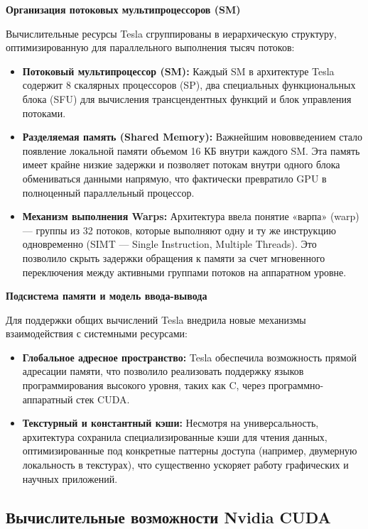 \documentclass{article}[14pt]
\begin{document}
\medskip \noindent \textbf{Организация потоковых мультипроцессоров (SM)}

Вычислительные ресурсы Tesla сгруппированы в иерархическую структуру, оптимизированную для параллельного выполнения тысяч потоков:
\begin{itemize}
    \item \textbf{Потоковый мультипроцессор (SM):} Каждый SM в архитектуре Tesla содержит 8 скалярных процессоров (SP), два специальных функциональных блока (SFU) для вычисления трансцендентных функций и блок управления потоками.
    \item \textbf{Разделяемая память (Shared Memory):} Важнейшим нововведением стало появление локальной памяти объемом 16 КБ внутри каждого SM. Эта память имеет крайне низкие задержки и позволяет потокам внутри одного блока обмениваться данными напрямую, что фактически превратило GPU в полноценный параллельный процессор.
    \item \textbf{Механизм выполнения Warps:} Архитектура ввела понятие «варпа» (warp) — группы из 32 потоков, которые выполняют одну и ту же инструкцию одновременно (SIMT — Single Instruction, Multiple Threads). Это позволило скрыть задержки обращения к памяти за счет мгновенного переключения между активными группами потоков на аппаратном уровне.
\end{itemize}

\medskip \noindent \textbf{Подсистема памяти и модель ввода-вывода}

Для поддержки общих вычислений Tesla внедрила новые механизмы взаимодействия с системными ресурсами:
\begin{itemize}
    \item \textbf{Глобальное адресное пространство:} Tesla обеспечила возможность прямой адресации памяти, что позволило реализовать поддержку языков программирования высокого уровня, таких как C, через программно-аппаратный стек CUDA.
    \item \textbf{Текстурный и константный кэши:} Несмотря на универсальность, архитектура сохранила специализированные кэши для чтения данных, оптимизированные под конкретные паттерны доступа (например, двумерную локальность в текстурах), что существенно ускоряет работу графических и научных приложений.
\end{itemize}

\subsection{Вычислительные возможности Nvidia CUDA}
\end{document}
